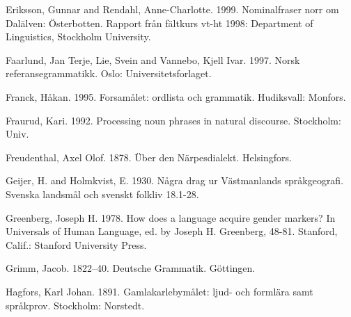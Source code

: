 \begin{styleBodytextC}
Eriksson, Gunnar and Rendahl, Anne-Charlotte. 1999. Nominalfraser norr om Dalälven: Österbotten. Rapport från fältkurs vt-ht 1998: Department of Linguistics, Stockholm University.

\end{styleBodytextC}

\begin{styleBodytextC}
Faarlund, Jan Terje, Lie, Svein and Vannebo, Kjell Ivar. 1997. Norsk referansegrammatikk. Oslo: Universitetsforlaget.

\end{styleBodytextC}

\begin{styleBodytextC}
Franck, Håkan. 1995. Forsamålet: ordlista och grammatik. Hudiksvall: Monfors.

\end{styleBodytextC}

\begin{styleBodytextC}
Fraurud, Kari. 1992. Processing noun phrases in natural discourse. Stockholm: Univ.

\end{styleBodytextC}

\begin{styleBodytextC}
Freudenthal, Axel Olof. 1878. Über den Närpesdialekt. Helsingfors.

\end{styleBodytextC}

\begin{styleBodytextC}
Geijer, H. and Holmkvist, E. 1930. Några drag ur Västmanlands språkgeografi. Svenska landsmål och svenskt folkliv 18.1-28.

\end{styleBodytextC}

\begin{styleBodytextC}
Greenberg, Joseph H. 1978. How does a language acquire gender markers? In Universals of Human Language, ed. by Joseph H. Greenberg, 48-81. Stanford, Calif.: Stanford University Press.

\end{styleBodytextC}

\begin{styleBodytextC}
Grimm, Jacob. 1822–40. Deutsche Grammatik. Göttingen.

\end{styleBodytextC}

\begin{styleBodytextC}
Hagfors, Karl Johan. 1891. Gamlakarlebymålet: ljud- och formlära samt språkprov. Stockholm: Norstedt.

\end{styleBodytextC}

